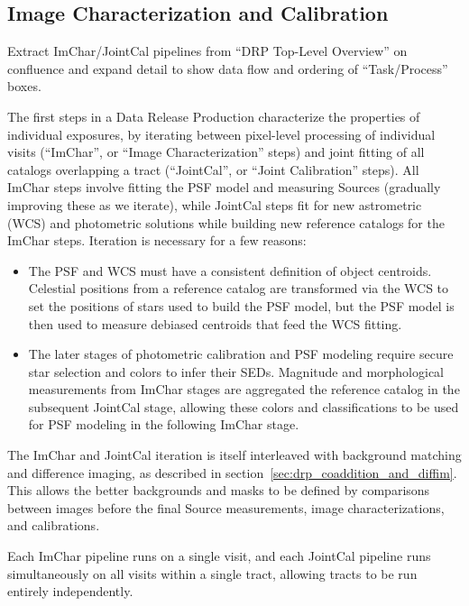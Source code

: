 \subsection{Image Characterization and Calibration}
\label{sec:drp_imchar_and_jointcal}

\begin{note}
Extract ImChar/JointCal pipelines from ``DRP Top-Level Overview'' on confluence and expand detail to show data flow and ordering of ``Task/Process'' boxes.
\end{note}

The first steps in a Data Release Production characterize the properties of individual exposures, by iterating between pixel-level processing of individual visits (``ImChar'', or ``Image Characterization'' steps) and joint fitting of all catalogs overlapping a tract (``JointCal'', or ``Joint Calibration'' steps).  All ImChar steps involve fitting the PSF model and measuring Sources (gradually improving these as we iterate), while JointCal steps fit for new astrometric (WCS) and photometric solutions while building new reference catalogs for the ImChar steps.  Iteration is necessary for a few reasons:
\begin{itemize}
\item The PSF and WCS must have a consistent definition of object centroids.  Celestial positions from a reference catalog are transformed via the WCS to set the positions of stars used to build the PSF model, but the PSF model is then used to measure debiased centroids that feed the WCS fitting.
\item The later stages of photometric calibration and PSF modeling require secure star selection and colors to infer their SEDs.  Magnitude and morphological measurements from ImChar stages are aggregated the reference catalog in the subsequent JointCal stage, allowing these colors and classifications to be used for PSF modeling in the following ImChar stage.
\end{itemize}

The ImChar and JointCal iteration is itself interleaved with background matching and difference imaging, as described in section~\ref{sec:drp_coaddition_and_diffim}.  This allows the better backgrounds and masks to be defined by comparisons between images before the final Source measurements, image characterizations, and calibrations.

Each ImChar pipeline runs on a single visit, and each JointCal pipeline runs simultaneously on all visits within a single tract, allowing tracts to be run entirely independently.

